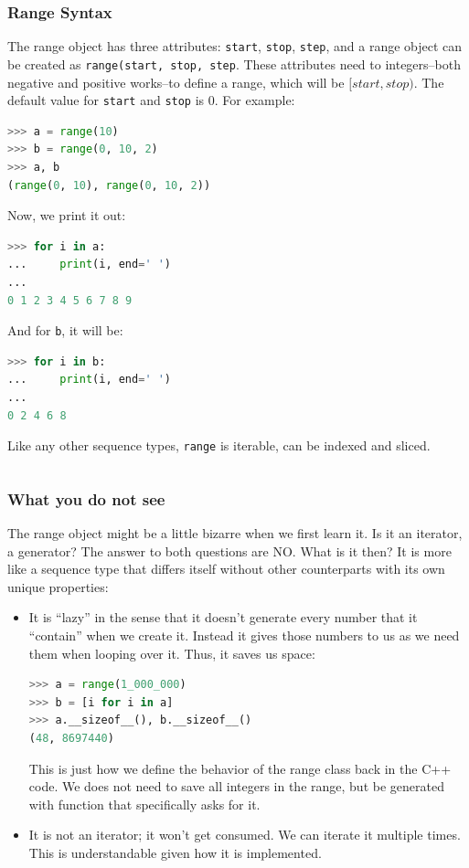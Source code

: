 \documentclass[../main.tex]{subfiles}
\begin{document}
\subsubsection{Range Syntax}
The range object has three attributes: \texttt{start}, \texttt{stop}, \texttt{step}, and a range object can be created as \texttt{range(start, stop, step}. These attributes need to integers--both negative and positive works--to define a range, which will be $[start, stop)$. The default value for \texttt{start} and \texttt{stop} is 0.  For example:
\begin{lstlisting}[language=Python]
>>> a = range(10)
>>> b = range(0, 10, 2)
>>> a, b
(range(0, 10), range(0, 10, 2))
\end{lstlisting}
Now, we print it out:
\begin{lstlisting}[language=Python]
>>> for i in a:
...     print(i, end=' ')
... 
0 1 2 3 4 5 6 7 8 9
\end{lstlisting}
And for \texttt{b}, it will be:
\begin{lstlisting}[language=Python]
>>> for i in b:
...     print(i, end=' ')
... 
0 2 4 6 8
\end{lstlisting}
Like any other sequence types, \texttt{range} is iterable, can be indexed and sliced. 
\begin{lstlisting}[language=Python]
\end{lstlisting}
\subsubsection{What you do not see}
The range object might be a little bizarre when we first learn it. Is it an iterator, a generator? The answer to both questions are NO. What is it then? It is more like a sequence type that differs itself without other counterparts with its own unique properties: 
\begin{itemize}
    \item It is ``lazy'' in the sense that it doesn’t generate every number that it ``contain'' when we create it. Instead it gives those numbers to us as we need them when looping over it. Thus, it saves us space:
\begin{lstlisting}[language=Python]
>>> a = range(1_000_000)
>>> b = [i for i in a]
>>> a.__sizeof__(), b.__sizeof__()
(48, 8697440)
\end{lstlisting}
This is just how we define the behavior of the range class back in the C++ code. We does not need to save all integers in the range, but be generated with function that specifically asks for it. 
    \item It is not an iterator; it won't get consumed. We can iterate it multiple times. This is understandable given how it is implemented.
\end{itemize}
\end{document}
